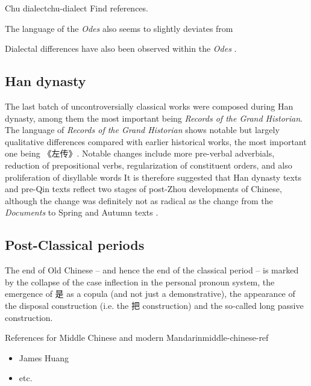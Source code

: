\documentclass[UTF8, a4paper, oneside, scheme=plain, 12pt]{ctexrep}
\newcommand*{\citepages}[1]{pp.~{#1}}
\newcommand{\form}[1]{\emph{#1}}
\newcommand{\work}[1]{\textit{#1}}
\begin{document}
\begin{todobox}{Chu dialect}{chu-dialect}
    Find references.
\end{todobox}

The language of the \work{Odes} also seems to slightly deviates from 

Dialectal differences have also been observed within the \work{Odes} \citep{list2017vowel}.



\subsection{Han dynasty}\label{sec:introduction.history.han}

The last batch of uncontroversially classical works were composed during Han dynasty,
among them the most important being \work{Records of the Grand Historian}.
The language of \form{Records of the Grand Historian} shows notable but largely qualitative differences
compared with earlier historical works,
the most important one being 《左传》.
Notable changes include more pre-verbal adverbials,
reduction of prepositional verbs,
regularization of constituent orders,
and also proliferation of disyllable words
It is therefore suggested that Han dynasty texts and pre-Qin texts 
reflect two stages of post-Zhou developments of Chinese,
although the change was definitely not as radical as the change 
from the \form{Documents} to Spring and Autumn texts 
\citep[\citepages{260-264}]{he2005shiji}.

\subsection{Post-Classical periods}

The end of Old Chinese -- and hence the end of the classical period --
is marked by the collapse of the case inflection in the personal pronoun system,
the emergence of 是 as a copula (and not just a demonstrative),
the appearance of the disposal construction (i.e. the 把 construction)
and the so-called long passive construction.

\begin{todobox}{References for Middle Chinese and modern Mandarin}{middle-chinese-ref}
    \begin{itemize}
        \item James Huang
        \item etc.
    \end{itemize}
\end{todobox}
\end{document}
